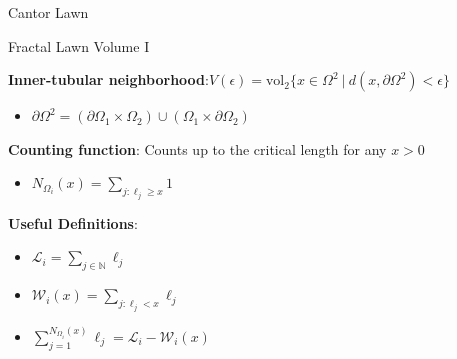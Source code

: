 \documentclass{if-beamer}
\newcommand{\N}{\mathbb{N}}
\newcommand{\SL}{\mathcal{L}}
\newcommand{\Om}{\Omega}
\newcommand{\W}{\mathcal{W}}
\begin{document}
\begin{frame}{Cantor Lawn}
	\begin{center}
	\end{center}
\end{frame}


\begin{frame}{Fractal Lawn Volume I}

{\bf Inner-tubular neighborhood}:\quad $V(\epsilon) = \text{vol}_2\{x \in \Om^2\ |\ d(x,\partial\Om^2) < \epsilon\}$
\pause 
\begin{itemize}
	\item $\partial\Om^2=(\partial\Om_1\times\Om_2)\cup(\Om_1\times\partial\Om_2)$
\end{itemize}
\pause
\vspace{.2in}

{\bf Counting function}: Counts up to the critical length for any $x > 0$
\pause
\begin{itemize}
	\item $\displaystyle N_{\Omega_i}(x) = \sum_{j: \ell_j \geq x}1$
\end{itemize}
\pause
\vspace{.2in}

{\bf Useful Definitions}:
\pause
\begin{itemize}
	\item $\displaystyle \SL_i=\sum_{j \in \N }\ell_j$
	\pause
	\item $\displaystyle \W_i(x)=\sum_{j: \ell_j < x}\ell_j$
	\pause
	\item $\displaystyle \sum_{j = 1}^{N_{\Om_i}(x)}\ell_j=\SL_i - \W_i(x)$
\end{itemize}


\end{frame}
\end{document}
